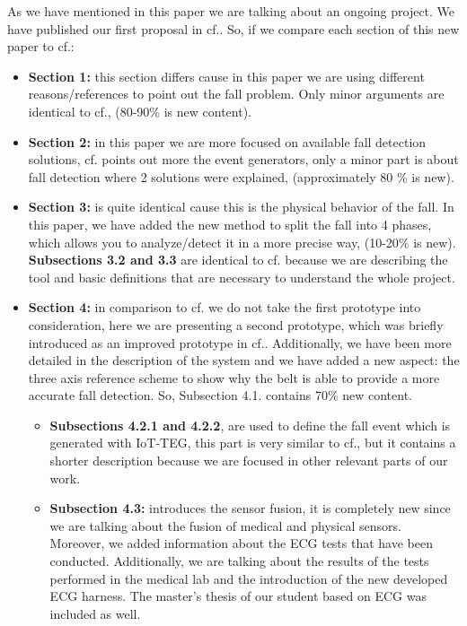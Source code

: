 \documentclass[parskip]{scrartcl}
\begin{document}
As we have mentioned in this paper we are talking about an ongoing project. We have published our first proposal in cf.\cite{LorenaFall}. So, if we compare each section of this new paper to cf.\cite{LorenaFall}:
\begin{itemize}
	\item \textbf{Section 1:} this section differs cause in this paper we are using  different reasons/references to point out the fall problem. Only minor arguments are identical to cf.\cite{LorenaFall}, (80-90\% is new content).
	\item \textbf{Section 2:} in this paper we are more focused on available fall detection solutions, cf.\cite{LorenaFall} points out more the event generators, only a minor part is about fall detection where 2 solutions were explained, (approximately 80 \% is new).
	\item \textbf{Section 3:} is quite identical cause this is the physical behavior of the fall. In this paper, we have added the new method to split the fall into 4 phases, which allows you to analyze/detect it in a more precise way, (10-20\% is new). \textbf{Subsections 3.2 and 3.3} are identical to cf.\cite{LorenaFall} because we are describing the tool and basic definitions that are necessary to understand the whole project. 
	\item \textbf{Section 4:} in comparison to cf.\cite{LorenaFall} we do not take the first prototype into consideration, here we are presenting a second prototype, which was briefly introduced as an improved prototype in cf.\cite{LorenaFall}. Additionally, we have been more detailed in the description of the system and we have added a new aspect: the three axis reference scheme to show why the belt is able to provide a more accurate fall detection. So, Subsection 4.1. contains 70\% new content.
	\begin{itemize}
		\item \textbf{Subsections 4.2.1 and 4.2.2}, are used to define the fall event which is generated with IoT-TEG, this part is very similar to cf.\cite{LorenaFall}, but it contains a shorter description because we are focused in other relevant parts of our work. 
		\item \textbf{Subsection 4.3:} introduces the sensor fusion, it is completely new since we are talking about the fusion of medical and physical sensors. Moreover, we added information about the ECG tests that have been conducted. Additionally, we are talking about the results of the tests performed in the medical lab and the introduction of the new developed ECG harness. The master's thesis of our student based on ECG was included as well. 

\end{itemize}
\end{itemize}
\end{document}
